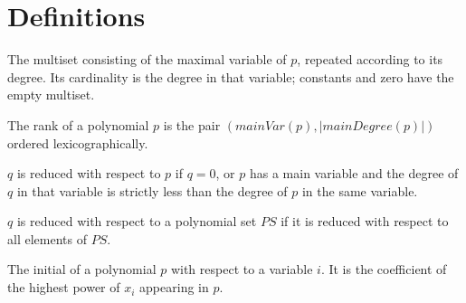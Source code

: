 %

\chapter{Definitions}
\label{chap:def}

\begin{definition}
    \label{def:mainDegree}
    \leanok
    The multiset consisting of the maximal variable of $p$, repeated according to its degree.
    Its cardinality is the degree in that variable; constants and zero have the empty multiset.
\end{definition}

\begin{definition}
    \label{def:MvPolynomial.rank}
    \leanok
    The rank of a polynomial $p$ is the pair $(mainVar(p), |mainDegree(p)|)$ ordered lexicographically.
\end{definition}

\begin{definition}
    \label{def:reducedTo}
    \leanok
    $q$ is reduced with respect to $p$ if $q = 0$, or $p$ has a main variable and the degree of $q$ in that variable is strictly less than the degree of $p$ in the same variable.
\end{definition}

\begin{definition}
    \label{def:reducedToSet}
    \leanok
    $q$ is reduced with respect to a polynomial set $PS$ if it is reduced with respect to all elements of $PS$.
\end{definition}

\begin{definition}
    \label{def:initialOf}
    \leanok
    The initial of a polynomial $p$ with respect to a variable $i$.
    It is the coefficient of the highest power of $x_i$ appearing in $p$.
\end{definition}

